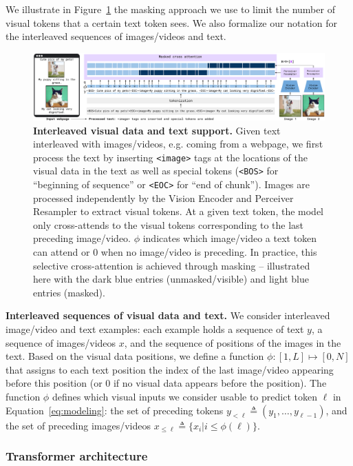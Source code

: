 We illustrate in Figure~\ref{fig:xattn_multi_im} the masking approach we use to limit the number of visual tokens that a certain text token sees.
We also formalize our notation for the interleaved sequences of images/videos and text.

\begin{figure}[t]
\includegraphics[width=\linewidth]{figures/fig5_multi_im_att.pdf}
\centering
\caption{\capfontsize{} \textbf{Interleaved visual data and text support.} 
Given text interleaved with images/videos, e.g. coming from a webpage, we first process the text by inserting \texttt{<image>} tags at the locations of the visual data in the text as well as special tokens (\texttt{<BOS>} for ``beginning of sequence'' or \texttt{<EOC>} for ``end of chunk'').
Images are processed independently by the Vision Encoder and Perceiver Resampler to extract visual tokens.
At a given text token, the model only cross-attends to the visual tokens corresponding to the last preceding image/video. 
$\phi$ indicates which image/video a text token can attend or $0$ when no image/video is preceding.
In practice, this selective cross-attention is achieved through masking -- illustrated here with the dark blue entries (unmasked/visible) and light blue entries (masked).
}
\label{fig:xattn_multi_im}
\end{figure}

\textbf{Interleaved sequences of visual data and text.}
We consider interleaved image/video and text examples: each example holds a sequence of text $y$, a sequence of images/videos $x$, and the sequence of positions of the images in the text. Based on the visual data positions, we define a function $\phi: [1, L] \mapsto [0, N] $ that assigns to each text position the index of the last image/video appearing before this position (or $0$ if no visual data appears before the position). 
The function $\phi$ defines which visual inputs we consider usable to predict token $\ell$ in Equation~\eqref{eq:modeling}: the set of preceding tokens $y_{< \ell} \triangleq (y_1, \dots, y_{\ell-1})$, and the set of preceding images/videos $x_{\leq \ell} \triangleq \{ x_i | i \leq \phi(\ell) \}$.


\subsubsection{Transformer architecture}
\label{app:transformer_details}

